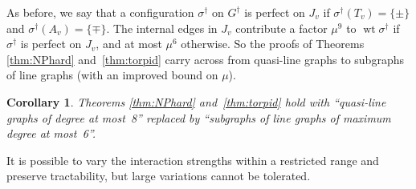 \documentclass[11pt]{amsart}
\newcommand{\wt}{\mathop{\mathrm{wt}}}
\newtheorem{corollary}[theorem]{Corollary}
\begin{document}
As before, we say that a configuration $\sigma^\dag$ on $G^\dag$ is perfect on $J_v$ if $\sigma^\dag(T_v)=\{\pm\}$ and $\sigma^\dag(A_v)=\{\mp\}$.  The internal edges in $J_v$ contribute a factor  $\mu^9$ to $\wt\sigma^\dag$ if $\sigma^\dag$ is perfect on $J_v$, and at most $\mu^6$ otherwise.  So the proofs of  Theorems \ref{thm:NPhard} and~\ref{thm:torpid} carry across from quasi-line graphs to subgraphs of line graphs (with an improved bound on $\mu$). 

\begin{corollary}
Theorems \ref{thm:NPhard} and~\ref{thm:torpid} hold with ``quasi-line graphs of  degree at most~8'' replaced by ``subgraphs of line graphs of maximum degree at most~6''.
\end{corollary}

It is possible to vary the interaction strengths within a restricted range and preserve tractability, but large variations cannot be tolerated.



\end{document}
